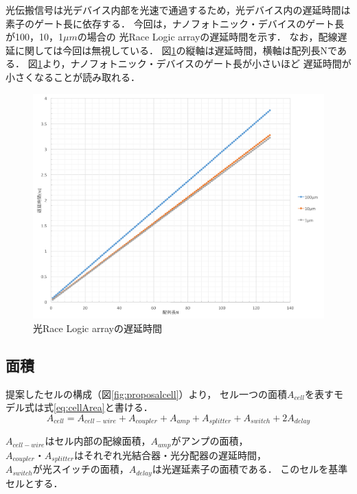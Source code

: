 光伝搬信号は光デバイス内部を光速で通過するため，光デバイス内の遅延時間は素子のゲート長に依存する．
今回は，ナノフォトニック・デバイスのゲート長が100，10，1$\mu m$の場合の
光Race Logic arrayの遅延時間を示す．
なお，配線遅延に関しては今回は無視している．
図\ref{fig:nanolatency}の縦軸は遅延時間，横軸は配列長Nである．
図\ref{fig:nanolatency}より，ナノフォトニック・デバイスのゲート長が小さいほど
遅延時間が小さくなることが読み取れる．
\begin{figure}[t!]
\begin{center}
\includegraphics[keepaspectratio,scale=0.5]{fig/4/nanolatency.png}
\caption{光Race Logic arrayの遅延時間}
\label{fig:nanolatency}
\end{center}
\end{figure}

\subsection{面積}
提案したセルの構成（図\ref{fig:proposalcell}）より，
セル一つの面積$A_{cell}$を表すモデル式は式\ref{eq:cellArea}と書ける．
\begin{equation}
A_{cell} = A_{cell-wire}+A_{coupler}+A_{amp}+A_{splitter}+A_{switch}+2A_{delay}
\label{eq:cellArea}
\end{equation}

$A_{cell-wire}はセル内部の配線面積，A_{amp}がアンプの面積，$
$A_{coupler}・A_{splitter}はそれぞれ光結合器・光分配器の遅延時間，$
$A_{switch}が光スイッチの面積，A_{delay}は光遅延素子の面積である．$
このセルを基準セルとする．

